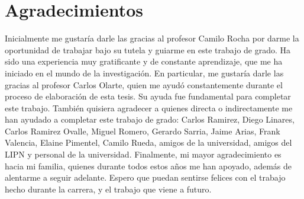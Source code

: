 \chapter*{Agradecimientos}
Inicialmente me gustaría darle las gracias al profesor Camilo Rocha por darme la oportunidad de trabajar bajo su tutela y guiarme en este trabajo de grado. Ha sido una experiencia muy gratificante y de constante aprendizaje, que me ha iniciado en el mundo de la investigación. En particular, me gustaría darle las gracias al profesor Carlos Olarte, quien me ayudó constantemente durante el proceso de elaboración de esta tesis. Su ayuda fue fundamental para completar este trabajo. También quisiera agradecer a quienes directa o indirectamente me han ayudado a completar este trabajo de grado: Carlos Ramirez, Diego Linares, Carlos Ramirez Ovalle, Miguel Romero, Gerardo Sarria, Jaime Arias, Frank Valencia, Elaine Pimentel, Camilo Rueda, amigos de la universidad, amigos del LIPN y  personal de la universidad. Finalmente, mi mayor agradecimiento es hacia mi familia, quienes durante todos estos años me han apoyado, además de alentarme a seguir adelante. Espero que puedan sentirse felices con el trabajo hecho durante la carrera, y el trabajo que viene a futuro.




